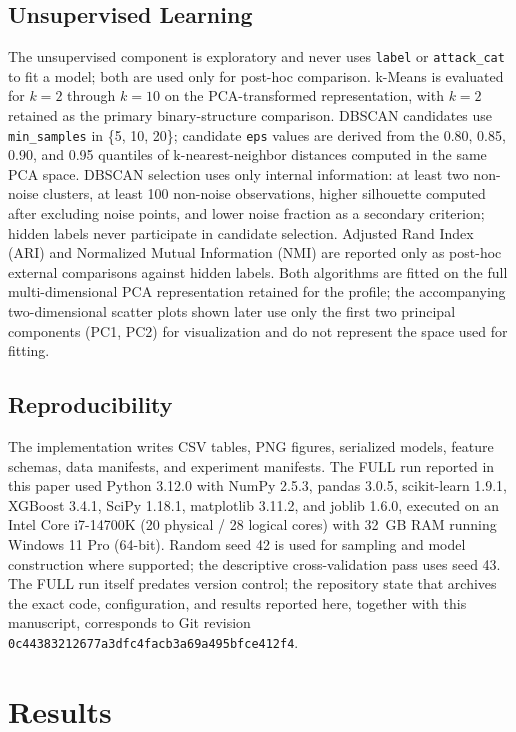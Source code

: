 \documentclass[conference]{IEEEtran}
\begin{document}
\subsection{Unsupervised Learning}
The unsupervised component is exploratory and never uses \texttt{label} or \texttt{attack\_cat} to fit a model; both are used only for post-hoc comparison. k-Means \cite{macqueen1967kmeans} is evaluated for $k=2$ through $k=10$ on the PCA-transformed representation, with $k=2$ retained as the primary binary-structure comparison. DBSCAN \cite{ester1996dbscan} candidates use \texttt{min\_samples} in \{5, 10, 20\}; candidate \texttt{eps} values are derived from the 0.80, 0.85, 0.90, and 0.95 quantiles of k-nearest-neighbor distances computed in the same PCA space. DBSCAN selection uses only internal information: at least two non-noise clusters, at least 100 non-noise observations, higher silhouette computed after excluding noise points, and lower noise fraction as a secondary criterion; hidden labels never participate in candidate selection. Adjusted Rand Index (ARI) and Normalized Mutual Information (NMI) are reported only as post-hoc external comparisons against hidden labels. Both algorithms are fitted on the full multi-dimensional PCA representation retained for the profile; the accompanying two-dimensional scatter plots shown later use only the first two principal components (PC1, PC2) for visualization and do not represent the space used for fitting.

\subsection{Reproducibility}
The implementation writes CSV tables, PNG figures, serialized models, feature schemas, data manifests, and experiment manifests. The FULL run reported in this paper used Python 3.12.0 with NumPy 2.5.3, pandas 3.0.5, scikit-learn 1.9.1, XGBoost 3.4.1, SciPy 1.18.1, matplotlib 3.11.2, and joblib 1.6.0, executed on an Intel Core i7-14700K (20 physical / 28 logical cores) with 32~GB RAM running Windows 11 Pro (64-bit). Random seed 42 is used for sampling and model construction where supported; the descriptive cross-validation pass uses seed 43. The FULL run itself predates version control; the repository state that archives the exact code, configuration, and results reported here, together with this manuscript, corresponds to Git revision \texttt{0c44383212677a3dfc4facb3a69a495bfce412f4}.

\section{Results}
\end{document}
